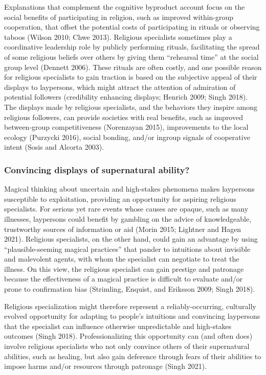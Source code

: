 \documentclass[
  11pt,
]{article}
\begin{document}
Explanations that complement the cognitive byproduct account focus on the social benefits of participating in religion, such as improved within-group cooperation, that offset the potential costs of participating in rituals or observing taboos (Wilson 2010; Chwe 2013). Religious specialists sometimes play a coordinative leadership role by publicly performing rituals, facilitating the spread of some religious beliefs over others by giving them ``rehearsal time'' at the social group level (Dennett 2006). These rituals are often costly, and one possible reason for religious specialists to gain traction is based on the subjective appeal of their displays to laypersons, which might attract the attention of admiration of potential followers (credibility enhancing displays; Henrich 2009; Singh 2018). The displays made by religious specialists, and the behaviors they inspire among religious followers, can provide societies with real benefits, such as improved between-group competitiveness (Norenzayan 2015), improvements to the local ecology (Purzycki 2016), social bonding, and/or ingroup signals of cooperative intent (Sosis and Alcorta 2003).

\hypertarget{convincing-displays-of-supernatural-ability}{%
\subsubsection{Convincing displays of supernatural ability?}\label{convincing-displays-of-supernatural-ability}}

Magical thinking about uncertain and high-stakes phenomena makes laypersons susceptible to exploitation, providing an opportunity for aspiring religious specialists. For serious yet rare events whose causes are opaque, such as many illnesses, laypersons could benefit by gambling on the advice of knowledgeable, trustworthy sources of information or aid (Morin 2015; Lightner and Hagen 2021). Religious specialists, on the other hand, could gain an advantage by using ``plausible-seeming magical practices'' that pander to intuitions about invisible and malevolent agents, with whom the specialist can negotiate to treat the illness. On this view, the religious specialist can gain prestige and patronage because the effectiveness of a magical practice is difficult to evaluate and/or prone to confirmation bias (Strimling, Enquist, and Eriksson 2009; Singh 2018).

Religious specialization might therefore represent a reliably-occurring, culturally evolved opportunity for adapting to people's intuitions and convincing laypersons that the specialist can influence otherwise unpredictable and high-stakes outcomes (Singh 2018). Professionalizing this opportunity can (and often does) involve religious specialists who not only convince others of their supernatural abilities, such as healing, but also gain deference through fears of their abilities to impose harms and/or resources through patronage (Singh 2021).
\end{document}
